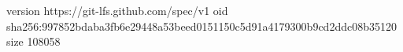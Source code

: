 version https://git-lfs.github.com/spec/v1
oid sha256:997852bdaba3fb6e29448a53beed0151150c5d91a4179300b9cd2ddc08b35120
size 108058
